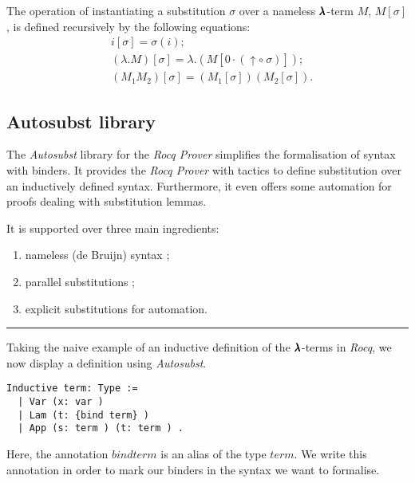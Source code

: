 \begin{definition}
  The operation of instantiating a substitution $\sigma$ over a nameless $\pmb{\lambda}$-term $M$, $M[\sigma]$, is defined recursively by the following equations:
  \begin{align*}
    & i[\sigma] = \sigma(i); \\
    & (\lambda . M)[\sigma] = \lambda . (M[0 \cdot (\uparrow \circ \ \sigma)]); \\
    & (M_1 M_2)[\sigma] = (M_1[\sigma]) (M_2[\sigma]).
  \end{align*}
\end{definition}

\subsection{Autosubst library}


The \textit{Autosubst} library for the \textit{Rocq Prover} simplifies the formalisation of syntax with binders.
It provides the \textit{Rocq Prover} with tactics to define substitution over an inductively defined syntax.
Furthermore, it even offers some automation for proofs dealing with substitution lemmas.

It is supported over three main ingredients:
\begin{enumerate}
\item nameless (de Bruijn) syntax ;
\item parallel substitutions ;
\item explicit substitutions for automation.
\end{enumerate}

\vspace{2em} \hrule \vspace{2em}

Taking the naive example of an inductive definition of the $\pmb{\lambda}$-terms in \textit{Rocq}, we now display a definition using \textit{Autosubst}.

\begin{lstlisting}[language=Coq]
  Inductive term: Type :=
  | Var (x: var )
  | Lam (t: {bind term} )
  | App (s: term ) (t: term ) .
\end{lstlisting}

Here, the annotation \lst ${bind term}$ is an alias of the type \lst$term$.
We write this annotation in order to mark our binders in the syntax we want to formalise.  

